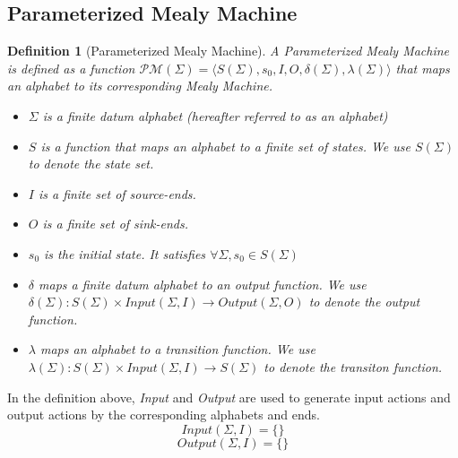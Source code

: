 \documentclass[conference, a4paper]{IEEEtran}
\newtheorem{definition}{Definition}
\begin{document}
\subsection{Parameterized Mealy Machine}
\begin{definition}[Parameterized Mealy Machine]
  A \emph{Parameterized Mealy Machine} is defined as a function $\mathcal{PM}(\Sigma)=\langle
  S(\Sigma), s_0, I, O, \delta(\Sigma), \lambda(\Sigma)\rangle$ that maps an
  alphabet to its corresponding Mealy Machine. 
  \begin{itemize}
    \item[-] $\Sigma$ is a \emph{finite} datum alphabet (hereafter referred to as an alphabet)
    \item[-] $S$ is a function that maps an alphabet to a \emph{finite} set of
      states. We use $S(\Sigma)$ to denote the state set.
    \item[-] $I$ is a finite set of source-ends.
    \item[-] $O$ is a finite set of sink-ends.
    \item[-] $s_0$ is the initial state. It satisfies $\forall \Sigma,s_0\in S(\Sigma)$
    \item[-] $\delta$ maps a \emph{finite} datum alphabet to an \emph{output function}. We use
      $\delta(\Sigma):S(\Sigma)\times Input(\Sigma,I)\rightarrow Output(\Sigma, O)$ to denote the output function.
    \item[-] $\lambda$ maps an alphabet to a \emph{transition function}. We use
      $\lambda(\Sigma):S(\Sigma)\times Input(\Sigma,I)\rightarrow S(\Sigma)$ to denote the transiton
      function.
  \end{itemize}
\end{definition}

In the definition above, \emph{Input} and \emph{Output} are used to generate input actions and output actions by the corresponding alphabets and ends.
\[
Input(\Sigma,I)=\{\}
\]
\[
Output(\Sigma,I)=\{\}
\]
\end{document}
